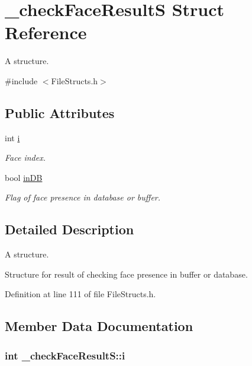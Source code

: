 \hypertarget{struct__check_face_result_s}{}\section{\+\_\+check\+Face\+ResultS Struct Reference}
\label{struct__check_face_result_s}


A structure.  




{\ttfamily \#include $<$File\+Structs.\+h$>$}

\subsection*{Public Attributes}
\begin{DoxyCompactItemize}
\item 
int \hyperlink{struct__check_face_result_s_a016b1da6b53d2a9fe2baf9a88b0699aa}{i}
\begin{DoxyCompactList}\small\item\em Face index. \end{DoxyCompactList}\item 
bool \hyperlink{struct__check_face_result_s_aa7353d6109af6ce0a9b2c8c07e09a48b}{in\+DB}
\begin{DoxyCompactList}\small\item\em Flag of face presence in database or buffer. \end{DoxyCompactList}\end{DoxyCompactItemize}


\subsection{Detailed Description}
A structure. 

Structure for result of checking face presence in buffer or database. 

Definition at line 111 of file File\+Structs.\+h.



\subsection{Member Data Documentation}
\subsubsection[{\texorpdfstring{i}{i}}]{\setlength{\rightskip}{0pt plus 5cm}int \+\_\+check\+Face\+Result\+S\+::i}\hypertarget{struct__check_face_result_s_a016b1da6b53d2a9fe2baf9a88b0699aa}{}\label{struct__check_face_result_s_a016b1da6b53d2a9fe2baf9a88b0699aa}



